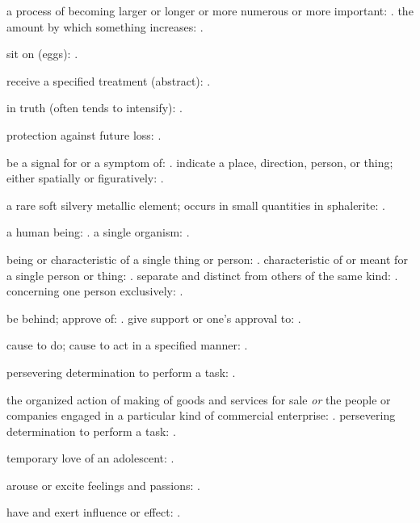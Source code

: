   a process of becoming larger or longer or more numerous or more important: . the amount by which something increases: .

  sit on (eggs): .

  receive a specified treatment (abstract): .

  in truth (often tends to intensify): .

  protection against future loss: .

  be a signal for or a symptom of: . indicate a place, direction, person, or thing; either spatially or figuratively: .

  a rare soft silvery metallic element; occurs in small quantities in sphalerite: .

  a human being: . a single organism: .

  being or characteristic of a single thing or person: . characteristic of or meant for a single person or thing: . separate and distinct from others of the same kind: . concerning one person exclusively: .

  be behind; approve of: . give support or one's approval to: .

  cause to do; cause to act in a specified manner: .

  persevering determination to perform a task: .

  the organized action of making of goods and services for sale \textit{or} the people or companies engaged in a particular kind of commercial enterprise: . persevering determination to perform a task: .

  temporary love of an adolescent: .

  arouse or excite feelings and passions: .

  have and exert influence or effect: .

